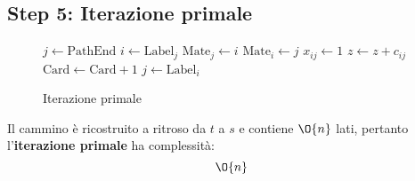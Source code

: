 \documentclass[\main/main.tex]{subfiles}
\begin{document}
\clearpage
\subsection{Step 5: Iterazione primale}
\begin{figure}
	\begin{algorithm}[H]
		\SetAlgoLined
		\(j\leftarrow \text{PathEnd}\)\;
		 {
			\(i \leftarrow \text{Label}_j\)\;
			\(\text{Mate}_j \leftarrow i\)\;
			\(\text{Mate}_i \leftarrow j\)\;
			\(x_{ij} \leftarrow 1\)\;
			\(z \leftarrow z + c_{ij}\)\;
			\(\text{Card} \leftarrow \text{Card} + 1\)\;
			\(j \leftarrow \text{Label}_i\)\;
		}
		\caption{Iterazione primale}
	\end{algorithm}
\end{figure}
\begin{complexity}
	Il cammino è ricostruito a ritroso da \(t\) a \(s\) e contiene \(\O{n}\) lati, pertanto l'\textbf{iterazione primale} ha complessità:
	\[
		\O{n}
	\]
\end{complexity}
\end{document}

